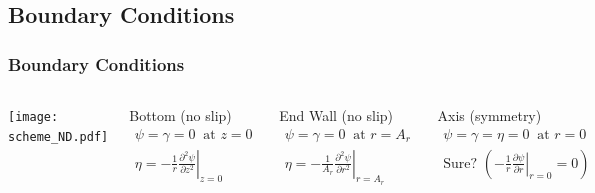 \documentclass[compress]{beamer}
\begin{document}
\subsection{Boundary Conditions}

\begin{frame} \frametitle{Boundary Conditions}
\begin{columns}
\texttt{[image: scheme\_ND.pdf]}
\pause
\vspace{-6mm}
{\small
\begin{block}{Bottom (no slip)}
\vspace{-5mm}
\begin{align*}
\psi=\gamma=0~\text{ at } z=0\\
\eta=\left.-\frac{1}{r}\frac{\partial^2\psi}{\partial z^2}\right|_{z=0}
\end{align*}
\end{block}}
\pause
\vspace{-1mm}
{\small
\begin{block}{End Wall (no slip)}
\vspace{-5mm}
\begin{align*}
\psi=\gamma=0~\text{ at } r=A_r\\
\eta=\left.-\frac{1}{A_r}\frac{\partial^2\psi}{\partial r^2}\right|_{r=A_r}
\end{align*}
\end{block}}
\pause
\vspace{-1mm}
{\small
\begin{block}{Axis (symmetry)}
\vspace{-5mm}
\begin{align*}
\psi=\gamma=\eta=0~\text{ at } r=0\\
\text{Sure?  }
\left(\left.-\frac{1}{r}\frac{\partial\psi}{\partial r}\right|_{r=0}= 0\right)
\end{align*}
\end{block}}
\end{columns}
\end{frame}
\end{document}
